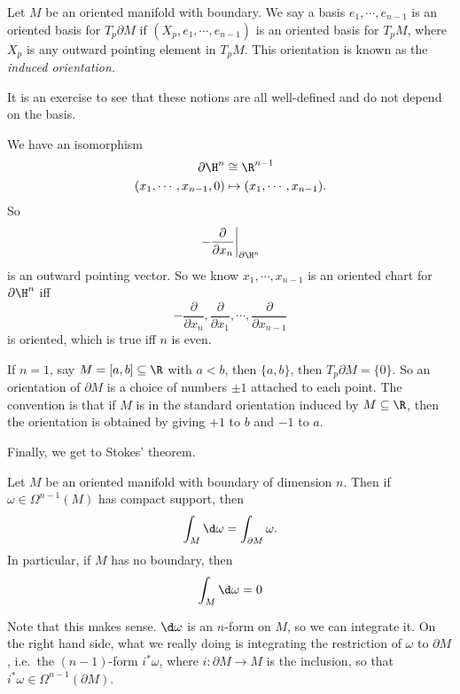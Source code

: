 \documentclass[a4paper]{article}
\begin{document}
\begin{defi}
  Let $M$ be an oriented manifold with boundary. We say a basis $e_1,\cdots, e_{n - 1}$ is an oriented basis for $T_p \partial M$ if $(X_p, e_1, \cdots, e_{n - 1})$ is an oriented basis for $T_p M$, where $X_p$ is any outward pointing element in $T_p M$. This orientation is known as the \emph{induced orientation}.
\end{defi}

It is an exercise to see that these notions are all well-defined and do not depend on the basis.
\begin{eg}
  We have an isomorphism
  \begin{align*}
    \partial\H^n &\cong \R^{n - 1}\\
    (x_1, \cdots, x_{n - 1}, 0) &\mapsto (x_1, \cdots, x_{n - 1}).
  \end{align*}
  So
  \[
    \left.-\frac{\partial}{\partial x_n}\right|_{\partial \H^n}
  \]
  is an outward pointing vector. So we know $x_1, \cdots, x_{n - 1}$ is an oriented chart for $\partial \H^n$ iff
  \[
    -\frac{\partial}{\partial x_n}, \frac{\partial}{\partial x_1}, \cdots, \frac{\partial}{\partial x_{n-1}}
  \]
  is oriented, which is true iff $n$ is even.
\end{eg}

\begin{eg}
  If $n = 1$, say $M = [a, b] \subseteq \R$ with $a < b$, then $\{a, b\}$, then $T_p \partial M = \{0\}$. So an orientation of $\partial M$ is a choice of numbers $\pm 1$ attached to each point. The convention is that if $M$ is in the standard orientation induced by $M \subseteq \R$, then the orientation is obtained by giving $+1$ to $b$ and $-1$ to $a$.
\end{eg}

Finally, we get to Stokes' theorem.
\begin{thm}
  Let $M$ be an oriented manifold with boundary of dimension $n$. Then if $\omega \in \Omega^{n - 1}(M)$ has compact support, then
  \[
    \int_M \d \omega = \int_{\partial M}\omega.
  \]
  In particular, if $M$ has no boundary, then
  \[
    \int_M \d \omega = 0
  \]
\end{thm}
Note that this makes sense. $\d \omega$ is an $n$-form on $M$, so we can integrate it. On the right hand side, what we really doing is integrating the restriction of $\omega$ to $\partial M$, i.e.\ the $(n - 1)$-form $i^* \omega$, where $i: \partial M \to M$ is the inclusion, so that $i^* \omega \in \Omega^{n - 1}(\partial M)$.
\end{document}
